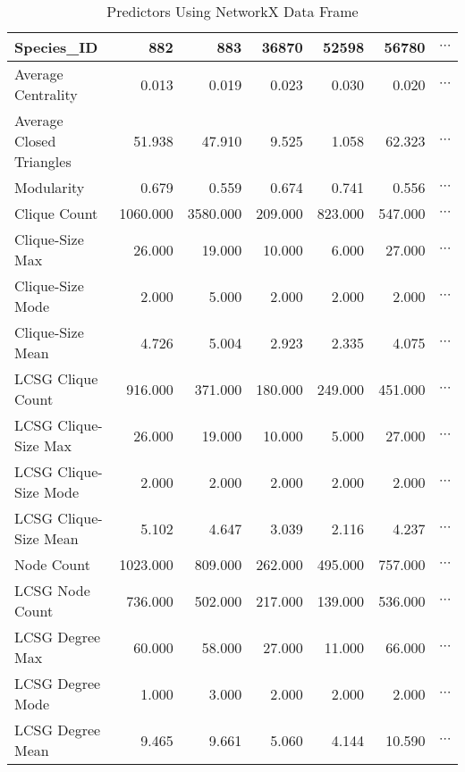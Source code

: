 \documentclass[12pt]{article}
\begin{document}
\begin{table}[H]
\centering
\caption{Predictors Using NetworkX Data Frame}
\begin{tabular}{lrrrrrr}
\toprule
Species\_ID &     882   &     883   &    36870 &    52598 &    56780  & $\cdots$\\
\midrule
Average Centrality       &     0.013 &     0.019 &    0.023 &    0.030 &    0.020 & $\cdots$\\
Average Closed Triangles &    51.938 &    47.910 &    9.525 &    1.058 &   62.323 & $\cdots$\\
Modularity               &     0.679 &     0.559 &    0.674 &    0.741 &    0.556 & $\cdots$\\
Clique Count             &  1060.000 &  3580.000 &  209.000 &  823.000 &  547.000 & $\cdots$\\
Clique-Size Max          &    26.000 &    19.000 &   10.000 &    6.000 &   27.000 & $\cdots$\\
Clique-Size Mode         &     2.000 &     5.000 &    2.000 &    2.000 &    2.000 & $\cdots$\\
Clique-Size Mean         &     4.726 &     5.004 &    2.923 &    2.335 &    4.075 & $\cdots$\\
LCSG Clique Count        &   916.000 &   371.000 &  180.000 &  249.000 &  451.000 & $\cdots$\\
LCSG Clique-Size Max     &    26.000 &    19.000 &   10.000 &    5.000 &   27.000 & $\cdots$\\
LCSG Clique-Size Mode    &     2.000 &     2.000 &    2.000 &    2.000 &    2.000 & $\cdots$\\
LCSG Clique-Size Mean    &     5.102 &     4.647 &    3.039 &    2.116 &    4.237 & $\cdots$\\
Node Count               &  1023.000 &   809.000 &  262.000 &  495.000 &  757.000 & $\cdots$\\
LCSG Node Count          &   736.000 &   502.000 &  217.000 &  139.000 &  536.000 & $\cdots$\\
LCSG Degree Max          &    60.000 &    58.000 &   27.000 &   11.000 &   66.000 & $\cdots$\\
LCSG Degree Mode         &     1.000 &     3.000 &    2.000 &    2.000 &    2.000 & $\cdots$\\
LCSG Degree Mean         &     9.465 &     9.661 &    5.060 &    4.144 &   10.590 & $\cdots$\\
\bottomrule
\end{tabular}
\end{table}
\end{document}
